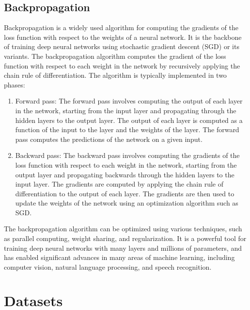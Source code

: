\subsection{Backpropagation} \label{subsec:lp}
Backpropagation is a widely used algorithm for computing the gradients of the loss function with respect to the weights of a neural network.
It is the backbone of training deep neural networks using stochastic gradient descent (SGD) or its variants.
The backpropagation algorithm computes the gradient of the loss function with respect to each weight in the network by recursively
applying the chain rule of differentiation. The algorithm is typically implemented in two phases:
\begin{enumerate}
    \item Forward pass: The forward pass involves computing the output of each layer in the network, starting from the input layer and propagating through the hidden layers to the output layer. The output of each layer is computed as a function of the input to the layer and the weights of the layer. The forward pass computes the predictions of the network on a given input.
    \item Backward pass: The backward pass involves computing the gradients of the loss function with respect to each weight in the network, starting from the output layer and propagating backwards through the hidden layers to the input layer. The gradients are computed by applying the chain rule of differentiation to the output of each layer. The gradients are then used to update the weights of the network using an optimization algorithm such as SGD.
\end{enumerate}
The backpropagation algorithm can be optimized using various techniques, such as parallel computing, weight sharing, and regularization.
It is a powerful tool for training deep neural networks with many layers and millions of parameters, and has enabled
significant advances in many areas of machine learning, including computer vision, natural language processing, and speech recognition.
\section{Datasets} \label{subsec:datasets}


